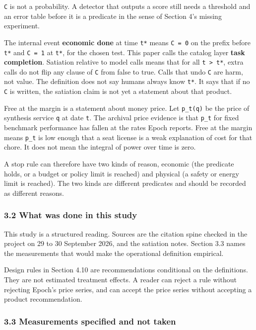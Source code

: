 \documentclass[
  10pt,
]{article}
\begin{document}
\texttt{C} is not a probability. A detector that outputs a score still
needs a threshold and an error table before it is a predicate in the
sense of Section 4's missing experiment.

The internal event \textbf{economic done} at time \texttt{t*} means
\texttt{C\ =\ 0} on the prefix before \texttt{t*} and \texttt{C\ =\ 1}
at \texttt{t*}, for the chosen test. This paper calls the catalog layer
\textbf{task completion}. Satiation relative to model calls means that
for all \texttt{t\ \textgreater{}\ t*}, extra calls do not flip any
clause of \texttt{C} from false to true. Calls that undo \texttt{C} are
harm, not value. The definition does not say humans always know
\texttt{t*}. It says that if no \texttt{C} is written, the satiation
claim is not yet a statement about that product.

Free at the margin is a statement about money price. Let
\texttt{p\_t(q)} be the price of synthesis service \texttt{q} at date
\texttt{t}. The archival price evidence is that \texttt{p\_t} for fixed
benchmark performance has fallen at the rates Epoch reports. Free at the
margin means \texttt{p\_t} is low enough that a seat license is a weak
explanation of cost for that chore. It does not mean the integral of
power over time is zero.

A stop rule can therefore have two kinds of reason, economic (the
predicate holds, or a budget or policy limit is reached) and physical (a
safety or energy limit is reached). The two kinds are different
predicates and should be recorded as different reasons.

\subsubsection{3.2 What was done in this
study}\label{what-was-done-in-this-study}

This study is a structured reading. Sources are the citation spine
checked in the project on 29 to 30 September 2026, and the satiation
notes. Section 3.3 names the measurements that would make the
operational definition empirical.

Design rules in Section 4.10 are recommendations conditional on the
definitions. They are not estimated treatment effects. A reader can
reject a rule without rejecting Epoch's price series, and can accept the
price series without accepting a product recommendation.

\subsubsection{3.3 Measurements specified and not
taken}\label{measurements-specified-and-not-taken}
\end{document}
